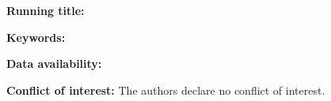 

\maketitle

\noindent\textbf{Running title:}

\noindent\textbf{Keywords:}

\noindent\textbf{Data availability:}

\noindent\textbf{Conflict of interest:} The authors declare no conflict of interest.

